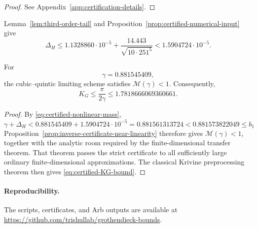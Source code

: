 \begin{proof}
See Appendix~\ref{app:certification-details}.
\end{proof}

Lemma~\ref{lem:third-order-tail} and
Proposition~\ref{prop:certified-numerical-input} give
\begin{equation}
  \Delta_H
  \le
  1.1328860\cdot10^{-5}
  +\frac{14.443}{\sqrt{10\cdot251^5}}
  <1.5904724\cdot10^{-5}.
  \label{eq:certified-nonlinear-mass}
\end{equation}

\begin{theorem}
\label{thm:cubic-quintic-upper-bound-certified}
For
\[
  \gamma=0.881545409,
\]
the cubic--quintic limiting scheme satisfies $\mathcal M(\gamma)<1$.
Consequently,
\begin{equation}
  K_G\le\frac{\pi}{2\gamma}
  \le1.7818666069360661.
  \label{eq:certified-KG-bound}
\end{equation}
\end{theorem}

\begin{proof}
By \eqref{eq:certified-nonlinear-mass},
\[
  \gamma+\Delta_H
  <0.881545409+1.5904724\cdot10^{-5}
   =0.881561313724
   <0.881573822049
   \le b_1
\]
Proposition~\ref{prop:inverse-certificate-near-linearity} therefore gives
$\mathcal M(\gamma)<1$, together with the analytic room required by the
finite-dimensional transfer theorem.  That theorem passes the strict
certificate to all sufficiently large ordinary finite-dimensional
approximations.  The classical Krivine preprocessing theorem then gives
\eqref{eq:certified-KG-bound}.
\end{proof}


\paragraph{Reproducibility.}
  The scripts, certificates, and Arb outputs
  are available at \url{https://github.com/trishullab/grothendieck-bounds}. 